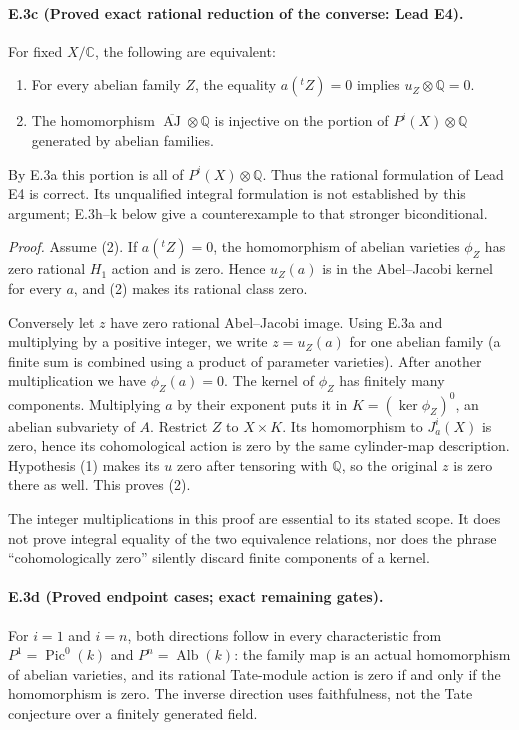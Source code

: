 \paragraph{E.3c (Proved exact rational reduction of the converse: Lead E4).}
For fixed $X/\mathbb C$, the following are equivalent:
\begin{enumerate}
\item For every abelian family $Z$, the equality
$a({}^tZ)=0$ implies $u_Z\otimes\mathbb Q=0$.
\item The homomorphism
$\overline{\operatorname{AJ}}\otimes\mathbb Q$
is injective on the portion of $P^i(X)\otimes\mathbb Q$ generated
by abelian families.
\end{enumerate}
By E.3a this portion is all of $P^i(X)\otimes\mathbb Q$.
Thus the rational formulation of Lead E4 is correct. Its unqualified
integral formulation is not established by this argument;
E.3h--k below give a counterexample to that stronger biconditional.

\emph{Proof.}
Assume (2). If $a({}^tZ)=0$, the homomorphism of abelian varieties
$\phi_Z$ has zero rational $H_1$ action and is zero. Hence
$u_Z(a)$ is in the Abel--Jacobi kernel for every $a$, and (2)
makes its rational class zero.

Conversely let $z$ have zero rational Abel--Jacobi image. Using
E.3a and multiplying by a positive integer, we write
$z=u_Z(a)$ for one abelian family (a finite sum is combined using
a product of parameter varieties). After another multiplication
we have $\phi_Z(a)=0$. The kernel of $\phi_Z$ has finitely many
components. Multiplying $a$ by their exponent puts it in
$K=(\ker\phi_Z)^0$, an abelian subvariety of $A$.
Restrict $Z$ to $X\times K$. Its homomorphism to $J_a^i(X)$ is
zero, hence its cohomological action is zero by the same
cylinder-map description. Hypothesis (1) makes its $u$ zero
after tensoring with $\mathbb Q$, so the original $z$ is zero
there as well. This proves (2).

The integer multiplications in this proof are essential to its
stated scope. It does not prove integral equality of the two
equivalence relations, nor does the phrase ``cohomologically zero''
silently discard finite components of a kernel.

\paragraph{E.3d (Proved endpoint cases; exact remaining gates).}
For $i=1$ and $i=n$, both directions follow in every characteristic
from $P^1=\operatorname{Pic}^0(k)$ and
$P^n=\operatorname{Alb}(k)$: the family map is an actual homomorphism
of abelian varieties, and its rational Tate-module action is zero
if and only if the homomorphism is zero. The inverse direction
uses faithfulness, not the Tate conjecture over a finitely generated
field.

